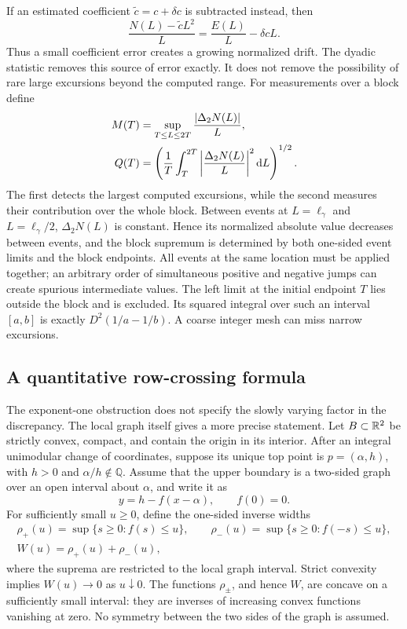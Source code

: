 If an estimated coefficient $\widetilde c=c+\delta c$ is subtracted
instead, then
\[
 \frac{N(L)-\widetilde cL^2}{L}
 =\frac{E(L)}L-\delta cL.
\]
Thus a small coefficient error creates a growing normalized drift. The
dyadic statistic removes this source of error exactly. It does not
remove the possibility of rare large excursions beyond the computed range.
For measurements over a block define
\begin{align}
 M(T)&=\sup_{T\le L\le2T}\frac{|\Delta_2N(L)|}{L},\notag\\
 Q(T)&=\left(\frac1T\int_T^{2T}
                    \left|\frac{\Delta_2N(L)}L\right|^2\mathop{}\!\mathrm d L\right)^{1/2}.
 \label{eq:dyadicblockmetrics}
\end{align}
The first detects the largest computed excursions, while the second
measures their contribution over the whole block. Between events at
$L=\ell_\gamma$ and $L=\ell_\gamma/2$, $\Delta_2N(L)$ is constant.
Hence its normalized absolute value decreases between events, and
the block supremum is determined by both one-sided event limits and the
block endpoints. All events at the same location must be applied together;
an arbitrary order of simultaneous positive and negative jumps can create
spurious intermediate values. The left limit at the initial endpoint
$T$ lies outside the block and is excluded.
Its squared integral over such an interval $[a,b]$ is exactly
$D^2(1/a-1/b)$. A coarse integer mesh can miss narrow excursions.


\subsection{A quantitative row-crossing formula}
\label{subsec:inverseflatness}

The exponent-one obstruction does not specify the slowly varying factor
in the discrepancy. The local graph itself gives a more precise statement.
Let $B\subset\mathbb R^2$ be strictly convex, compact, and contain the origin in
its interior. After an integral unimodular change of coordinates, suppose
its unique top point is $p=(\alpha,h)$, with $h>0$ and
$\alpha/h\notin\mathbb Q$. Assume that the upper boundary is a
two-sided graph over an open interval about $\alpha$, and write it as
\[
 y=h-f(x-\alpha),\qquad f(0)=0.
\]
For sufficiently small $u\geq0$, define the one-sided inverse widths
\[
\begin{gathered}
 \rho_+(u)=\sup\{s\geq0:f(s)\leq u\},\qquad
 \rho_-(u)=\sup\{s\geq0:f(-s)\leq u\},\\
 W(u)=\rho_+(u)+\rho_-(u),
\end{gathered}
\]
where the suprema are restricted to the local graph interval. Strict
convexity implies $W(u)\to0$ as $u\downarrow0$. The functions
$\rho_\pm$, and hence $W$, are concave on a sufficiently small interval:
they are inverses of increasing convex functions vanishing at zero.
No symmetry between the two sides of the graph is assumed.


